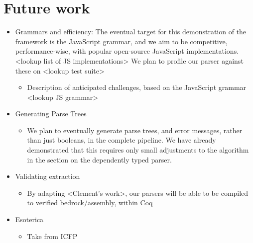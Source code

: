 \chapter{Future work}
  \begin{itemize} \item  Grammars and efficiency: The eventual target for this demonstration of the framework is the JavaScript grammar, and we aim to be competitive, performance-wise, with popular open-source JavaScript implementations. <lookup list of JS implementations>  We plan to profile our parser against these on <lookup test suite>
    \begin{itemize} \item  Description of anticipated challenges, based on the JavaScript grammar <lookup JS grammar> \end{itemize}
  \item  Generating Parse Trees
    \begin{itemize} \item  We plan to eventually generate parse trees, and error messages, rather than just booleans, in the complete pipeline.  We have already demonstrated that this requires only small adjustments to the algorithm in the section on the dependently typed parser. \end{itemize}
  \item  Validating extraction
    \begin{itemize} \item  By adapting <Clement's work>, our parsers will be able to be compiled to verified bedrock/assembly, within Coq \end{itemize}
  \item  Esoterica
    \begin{itemize} \item  Take from ICFP \end{itemize} \end{itemize}